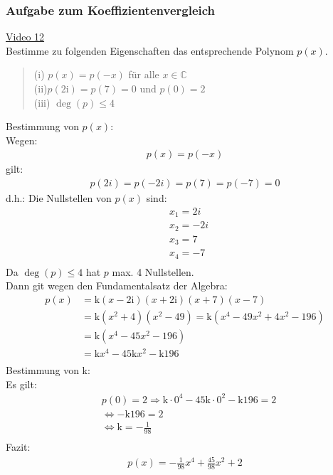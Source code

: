 \subsubsection{Aufgabe zum Koeffizientenvergleich}
\href{https://youtu.be/lLfxDN2AW4k}{Video 12}\\
Bestimme zu folgenden Eigenschaften das entsprechende Polynom $ p(x) $.\\
\begin{quote}
	(i)\;\; $ p(x)=p(-x)$ für alle $ x\in \mathbb{C} $\\
	(ii)\;\;$ p(2\mathrm{i})=p(7)=0 $ und $ p(0)=2 $\\
	(iii) $ \deg(p)\leq 4 $\\
\end{quote}
Bestimmung von $ p(x) $:\\
Wegen:\\
\begin{align*}
p(x)=p(-x)
\end{align*}
gilt:\\
\begin{align*}
p(2i)=p(-2i)=p(7)=p(-7)=0
\end{align*}
d.h.: Die Nullstellen von $ p(x) $ sind:\\
\begin{align*}
&x_1=2i\\
&x_2=-2i\\
&x_3=7\\
&x_4=-7\\
\end{align*}
Da $ \deg(p)\leq 4 $ hat $ p $ max. 4 Nullstellen.\\
Dann git wegen den Fundamentalsatz der Algebra:\\
\begin{align*}
p(x)&=\mathrm{k}(x-2\mathrm{i})(x+2\mathrm{i})(x+7)(x-7)\\
&=\mathrm{k}(x^2+4)(x^2-49)=\mathrm{k}(x^4-49x^2+4x^2-196)\\
&=\mathrm{k}(x^4-45x^2-196)\\
&=\mathrm{k}x^4-45\mathrm{k}x^2-\mathrm{k}196\\
\end{align*}
Bestimmung von k:\\
Es gilt:\\
\begin{align*}
&p(0)=2\Rightarrow \mathrm{k}\cdot 0^4 -45\mathrm{k}\cdot 0^2-\mathrm{k}196=2\\
&\Leftrightarrow -\mathrm{k}196=2\\
&\Leftrightarrow \mathrm{k}= -\frac{1}{98}\\
\end{align*}
Fazit:\\
\begin{align*}
p(x)=-\frac{1}{98}x^4+\frac{45}{98}x^2+2\\
\end{align*}
